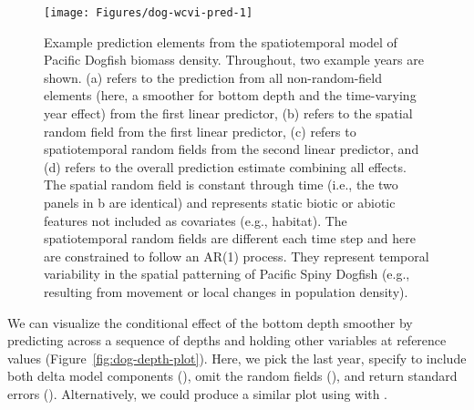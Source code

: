 \documentclass[article]{jss}\usepackage[]{graphicx}\usepackage[dvipsnames]{xcolor}
\newcommand{\fct}[1]{\code{#1()}}
\begin{document}
\begin{Schunk}
\begin{figure}[ht]

{\centering \texttt{[image: Figures/dog-wcvi-pred-1]} 

}

\caption[Example prediction elements from the spatiotemporal model of Pacific Dogfish biomass density]{Example prediction elements from the spatiotemporal model of Pacific Dogfish biomass density. Throughout, two example years are shown. (a)  refers to the prediction from all non-random-field elements (here, a smoother for bottom depth and the time-varying year effect) from the first linear predictor, (b)  refers to the spatial random field from the first linear predictor, (c)  refers to spatiotemporal random fields from the second linear predictor, and (d)  refers to the overall prediction estimate combining all effects. The spatial random field is constant through time (i.e., the two panels in b are identical) and represents static biotic or abiotic features not included as covariates (e.g., habitat). The spatiotemporal random fields are different each time step and here are constrained to follow an AR(1) process. They represent temporal variability in the spatial patterning of Pacific Spiny Dogfish (e.g., resulting from movement or local changes in population density).}\label{fig:dog-wcvi-pred}
\end{figure}
\end{Schunk}

We can visualize the conditional effect of the bottom depth smoother by predicting across a sequence of depths and holding other variables at reference values (Figure~\ref{fig:dog-depth-plot}).
Here, we pick the last year, specify to include both delta model components (), omit the random fields (), and return standard errors ().
Alternatively, we could produce a similar plot using  \citep{ggeffects} with \fct{ggeffects::ggpredict}.

\begin{Schunk}
\end{Schunk}
\end{document}
